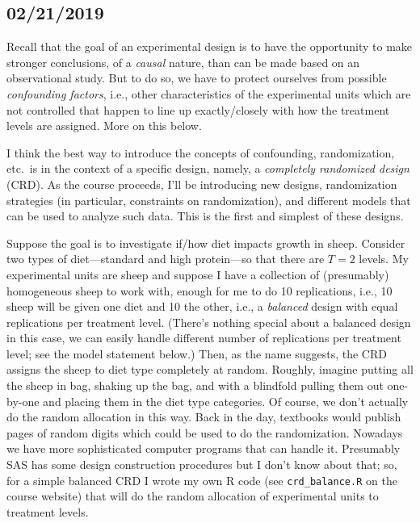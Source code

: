 \documentclass[a4paper, 12pt]{article}
\theoremstyle{plain}
\theoremstyle{definition}
\theoremstyle{remark}
\begin{document}
\subsection*{02/21/2019}

Recall that the goal of an experimental design is to have the opportunity to make stronger conclusions, of a {\em causal} nature, than can be made based on an observational study.  But to do so, we have to protect ourselves from possible {\em confounding factors}, i.e., other characteristics of the experimental units which are not controlled that happen to line up exactly/closely with how the treatment levels are assigned.  More on this below.  

I think the best way to introduce the concepts of confounding, randomization, etc.~is in the context of a specific design, namely, a {\em completely randomized design} (CRD).  As the course proceeds, I'll be introducing new designs, randomization strategies (in particular, constraints on randomization), and different models that can be used to analyze such data.  This is the first and simplest of these designs.  

Suppose the goal is to investigate if/how diet impacts growth in sheep.  Consider two types of diet---standard and high protein---so that there are $T=2$ levels.  My experimental units are sheep and suppose I have a collection of (presumably) homogeneous sheep to work with, enough for me to do 10 replications, i.e., 10 sheep will be given one diet and 10 the other, i.e., a {\em balanced} design with equal replications per treatment level.  (There's nothing special about a balanced design in this case, we can easily handle different number of replications per treatment level; see the model statement below.)  Then, as the name suggests, the CRD assigns the sheep to diet type completely at random.  Roughly, imagine putting all the sheep in bag, shaking up the bag, and with a blindfold pulling them out one-by-one and placing them in the diet type categories.  Of course, we don't actually do the random allocation in this way.  Back in the day, textbooks would publish pages of random digits which could be used to do the randomization.  Nowadays we have more sophisticated computer programs that can handle it.  Presumably SAS has some design construction procedures but I don't know about that; so, for a simple balanced CRD I wrote my own R code (see {\tt crd\_balance.R} on the course website) that will do the random allocation of experimental units to treatment levels.  
\end{document}
